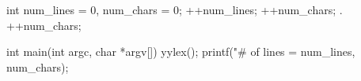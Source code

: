  int num_lines = 0, num_chars = 0;
\n			++num_lines; ++num_chars;
.			++num_chars;

int main(int argc, char *argv[]) {
	yylex();
	printf("# of lines = %
					num_lines, num_chars);
}
